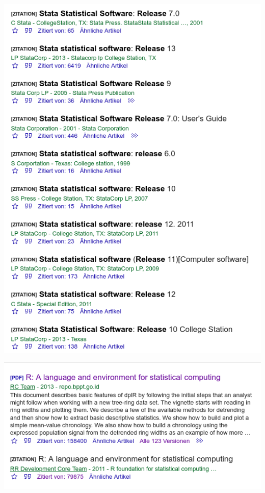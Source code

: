 \documentclass[
]{book}
\begin{document}
\begin{center}\includegraphics[width=1\linewidth]{imgs/Stata_1} \end{center}

\begin{center}\includegraphics[width=1\linewidth]{imgs/R_1} \end{center}
\end{document}

